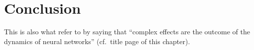 
\section{Conclusion}

This is also what \citet{churchland1992computational} refer to by saying that \enquote{complex effects are the outcome of the dynamics of neural networks} (cf.~title page of this chapter).

